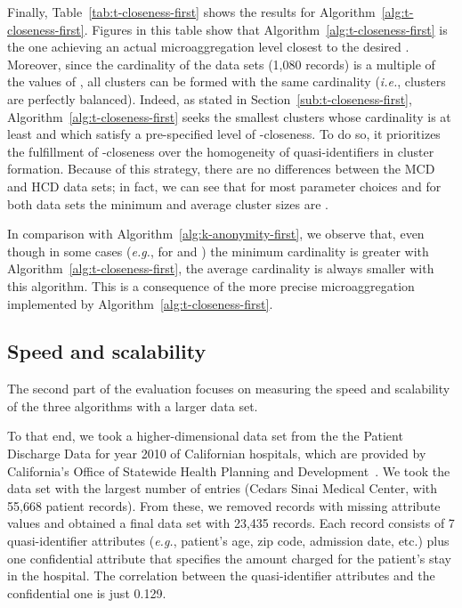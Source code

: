 \documentclass[10pt,journal,compsoc]{IEEEtran}
\theoremstyle{definition}
\theoremstyle{plain}
\begin{document}
Finally, Table~\ref{tab:t-closeness-first} shows the results for Algorithm~\ref{alg:t-closeness-first}.
Figures in this table show that Algorithm~\ref{alg:t-closeness-first}
is the one achieving an actual microaggregation level closest to 
the desired .
Moreover, since the cardinality of the data sets (1,080 records) is a multiple of the values of ,
all clusters can be formed with the same cardinality  ({\em i.e.}, clusters are perfectly balanced).
Indeed, as stated in Section~\ref{sub:t-closeness-first},
Algorithm~\ref{alg:t-closeness-first} 
seeks the smallest clusters whose cardinality 
is at least  and which satisfy a 
pre-specified level of -closeness. 
To do so, it prioritizes the fulfillment of 
-closeness over the homogeneity of quasi-identifiers 
in cluster formation. Because of this strategy,
there are no differences between the MCD and HCD data sets;
in fact, we can see that for most parameter choices and for both data sets
the minimum and average cluster sizes are .

In comparison with Algorithm~\ref{alg:k-anonymity-first}, we observe that,
even though in some cases ({\em e.g.}, for  and ) the minimum
cardinality is greater with Algorithm~\ref{alg:t-closeness-first}, 
the average cardinality is always smaller with this algorithm.
This is a consequence of the more precise 
microaggregation implemented by Algorithm~\ref{alg:t-closeness-first}.

\subsection{Speed and scalability}
\label{perform}

The second part of the evaluation focuses on measuring the speed
and scalability of the three algorithms with a larger data set.

To that end, we took a higher-dimensional data set from the 
the Patient Discharge Data for year 2010 of Californian hospitals,
which are provided by 
California's Office of Statewide Health Planning and Development~\cite{oshpd}. 
We took the data set with the largest number of entries
(Cedars Sinai Medical Center, with 55,668 patient records). 
From these, we removed records with missing attribute values and 
obtained a final data set with 23,435 records. Each record
consists of 7 quasi-identifier attributes ({\em e.g.}, patient's age, zip code, admission date, etc.)
plus one confidential attribute that specifies the amount charged
for the patient's stay in the hospital. The correlation
between the quasi-identifier attributes and the confidential one is just 0.129.
\end{document}
